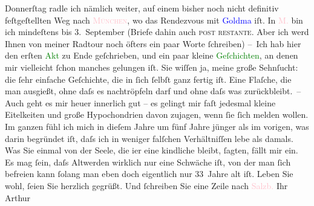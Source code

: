                         Donnerſtag radle ich nämlich weiter, auf einem bisher noch
                    nicht definitiv feſtgeſtellten Weg nach \textcolor{pink}{\textsc{München}}{}\ledrightnote{\textcolor{pink}{München}}, wo das Rendezvous mit
                        \textcolor{blue}{Goldma{\geminationn}}{}\ledrightnote{\textcolor{blue}{Paul Goldmann}} iſt. In \textcolor{pink}{M.}{}\ledrightnote{\textcolor{pink}{München}} bin ich mindeſtens
                    bis 3. September (Briefe dahin auch \textsc{post
                        restante}. Aber ich {\pb}werd Ihnen von
                    meiner Radtour noch öfters ein paar Worte ſchreiben)\pend
           \pstart
           – Ich hab hier den erſten \textcolor{green}{Akt}{} zu Ende
                    geſchrieben, und ein paar kleine \textcolor{green}{Geſchichten}{}, an denen mir vielleicht ſchon manches gelungen iſt. Sie
                    wiſſen ja, meine große Sehnſucht: die ſehr einfache Geſchichte, die in ſich
                    ſelbſt ganz fertig iſt. Eine Flaſche, die man ausgießt, ohne daſs es
                    nachtröpfeln darf und ohne daſs was zurückbleibt. – Auch geht es mir heuer
                    innerlich gut – es gelingt mir faſt jedesmal kleine Eitelkeiten und große {\pb}Hypochondrien davon zujagen, wenn ſie ſich
                    melden wollen. Im ganzen fühl ich mich in dieſem Jahre um fünf Jahre jünger als
                    im vorigen, was darin begründet iſt, daſs ich in weniger falſchen Verhältniſſen
                    lebe als damals. Was Sie einmal von der Seele, die i{\geminationm}er eine kindliche bleibt, ſagten, fällt mir ein. Es mag ſein, daſs Altwerden
                    wirklich nur eine Schwäche iſt, von der man ſich befreien kann{\dotsfour}{ }ſolang man eben doch eigentlich nur 33 Jahre alt
                    iſt.\pend
           \pstart
           Leben Sie wohl, ſeien Sie herzlich gegrüßt. Und ſchreiben Sie eine Zeile nach
                        \textcolor{pink}{Salzb.}{}\ledrightnote{\textcolor{pink}{Salzburg}}\pend
           \pstart Ihr \spacefill\mbox{Arthur}\pend{}\pstart
           \noindent{}\label{T_L00474_1v}\label{T_L00474_1h}\pend
           \endnumbering{}  
      